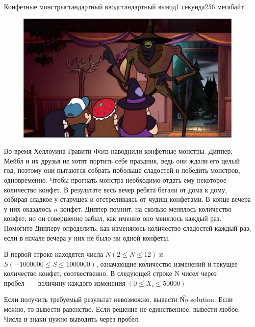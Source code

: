 \begin{problem}{Конфетные монстры}{стандартный ввод}{стандартный вывод}{1 секунда}{256 мегабайт}

\begin{figure}[h]
\hspace*{\fill}
\includegraphics[width=\linewidth,natwidth=601,natheight=343]{H.jpg}
\hspace*{\fill}
\end{figure}


Во время Хеллоуина Гравити Фолз наводнили конфетные монстры. Диппер, Мейбл и их друзья не хотят портить себе праздник, ведь они ждали его целый год, поэтому они пытаются собрать побольше сладостей и победить монстров, одновременно. Чтобы прогнать монстра необходимо отдать ему некоторое количество конфет. В результате весь вечер ребята бегали от дома к дому, собирая сладкое у старушек и отстреливаясь от чудищ конфетами. В конце вечера у них оказалось $n$ конфет. Диппер помнит, на сколько менялось количество конфет, но он совершенно забыл, как именно оно менялось каждый раз. Помогите Дипперу определить, как изменялось количество сладостей каждый раз, если в начале вечера у них не было ни одной конфеты.

\InputFile
В первой строке находятся числа $N (2 \le N \le 12)$ и $S(-1000000 \le S \le 1000000)$, означающие количество изменений и текущее количество конфет, соотвественно. В следующей строке N чисел через пробел~---~величину каждого изменения $(0 \le X_i \le 50000)$

\OutputFile
Если получить требуемый результат невозможно, вывести \t{No solution}. Если можно, то вывести равенство. Если решение не единственное, вывести любое. Числа и знаки нужно выводить через пробел.

\Example

\begin{example}
%
\end{example}

\end{problem}


